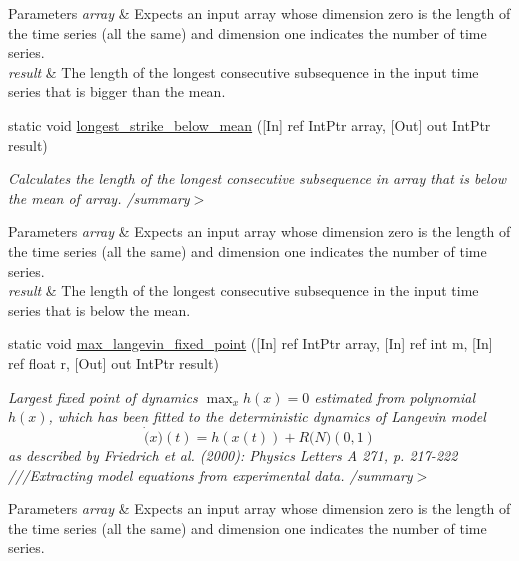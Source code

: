 \begin{DoxyCompactItemize}
\begin{DoxyCompactList}
\begin{DoxyParams}{Parameters}
{\em array} & Expects an input array whose dimension zero is the length of the time series (all the same) and dimension one indicates the number of time series.\\
\hline
{\em result} & The length of the longest consecutive subsequence in the input time series that is bigger than the mean.\\
\hline
\end{DoxyParams}
\end{DoxyCompactList}\item 
static void \mbox{\hyperlink{classkhiva_1_1interop_1_1_d_l_l_features_a49f978188a34926c68faa4653b9c3f00}{longest\+\_\+strike\+\_\+below\+\_\+mean}} (\mbox{[}In\mbox{]} ref Int\+Ptr array, \mbox{[}Out\mbox{]} out Int\+Ptr result)
\begin{DoxyCompactList}\small\item\em Calculates the length of the longest consecutive subsequence in array that is below the mean of array. /summary$>$ 
\begin{DoxyParams}{Parameters}
{\em array} & Expects an input array whose dimension zero is the length of the time series (all the same) and dimension one indicates the number of time series.\\
\hline
{\em result} & The length of the longest consecutive subsequence in the input time series that is below the mean.\\
\hline
\end{DoxyParams}
\end{DoxyCompactList}\item 
static void \mbox{\hyperlink{classkhiva_1_1interop_1_1_d_l_l_features_a57584c970ae956c1ed2b4793ebd4fc69}{max\+\_\+langevin\+\_\+fixed\+\_\+point}} (\mbox{[}In\mbox{]} ref Int\+Ptr array, \mbox{[}In\mbox{]} ref int m, \mbox{[}In\mbox{]} ref float r, \mbox{[}Out\mbox{]} out Int\+Ptr result)
\begin{DoxyCompactList}\small\item\em Largest fixed point of dynamics $\max_x {h(x)=0}$ estimated from polynomial $h(x)$, which has been fitted to the deterministic dynamics of Langevin model \[ \dot(x)(t) = h(x(t)) + R \mathcal(N)(0,1) \] as described by Friedrich et al. (2000)\+: Physics Letters A 271, p. 217-\/222 ///\+Extracting model equations from experimental data. /summary$>$ 
\begin{DoxyParams}{Parameters}
{\em array} & Expects an input array whose dimension zero is the length of the time series (all the same) and dimension one indicates the number of time series.\\

\end{DoxyParams}
\end{DoxyCompactList}
\end{DoxyCompactItemize}
